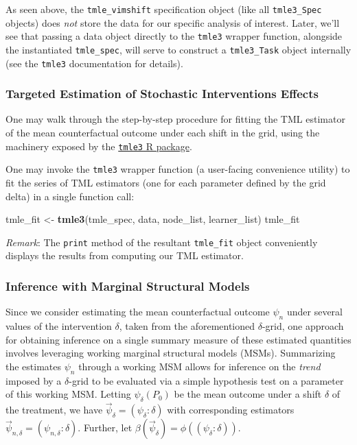 \documentclass[12pt, krantz2,]{krantz}
\newenvironment{Shaded}{\begin{snugshade}}{\end{snugshade}}
\newcommand{\KeywordTok}[1]{\textcolor[rgb]{0.27,0.27,0.27}{\textbf{#1}}}
\newcommand{\NormalTok}[1]{#1}
\newcommand{\StringTok}[1]{\textcolor[rgb]{0.5,0.5,0.5}{#1}}
\theoremstyle{definition}
\theoremstyle{definition}
\theoremstyle{definition}
\newcommand{\1}{\mathbbm{1}}
\begin{document}
As seen above, the \texttt{tmle\_vimshift} specification object (like all \texttt{tmle3\_Spec}
objects) does \emph{not} store the data for our specific analysis of interest. Later,
we'll see that passing a data object directly to the \texttt{tmle3} wrapper function,
alongside the instantiated \texttt{tmle\_spec}, will serve to construct a \texttt{tmle3\_Task}
object internally (see the \texttt{tmle3} documentation for details).

\hypertarget{targeted-estimation-of-stochastic-interventions-effects-1}{%
\subsubsection{Targeted Estimation of Stochastic Interventions Effects}\label{targeted-estimation-of-stochastic-interventions-effects-1}}

One may walk through the step-by-step procedure for fitting the TML estimator
of the mean counterfactual outcome under each shift in the grid, using the
machinery exposed by the \href{https://tmle3.tlverse.org/}{\texttt{tmle3} R package}.

One may invoke the \texttt{tmle3} wrapper function (a user-facing convenience utility)
to fit the series of TML estimators (one for each parameter defined by the grid
delta) in a single function call:

\begin{Shaded}
\begin{Highlighting}[]
\NormalTok{tmle_fit <-}\StringTok{ }\KeywordTok{tmle3}\NormalTok{(tmle_spec, data, node_list, learner_list)}
\NormalTok{tmle_fit}
\end{Highlighting}
\end{Shaded}

\emph{Remark}: The \texttt{print} method of the resultant \texttt{tmle\_fit} object conveniently
displays the results from computing our TML estimator.

\hypertarget{inference-with-marginal-structural-models}{%
\subsubsection{Inference with Marginal Structural Models}\label{inference-with-marginal-structural-models}}

Since we consider estimating the mean counterfactual outcome \(\psi_n\) under
several values of the intervention \(\delta\), taken from the aforementioned
\(\delta\)-grid, one approach for obtaining inference on a single summary measure
of these estimated quantities involves leveraging working marginal structural
models (MSMs). Summarizing the estimates \(\psi_n\) through a working MSM allows
for inference on the \emph{trend} imposed by a \(\delta\)-grid to be evaluated via a
simple hypothesis test on a parameter of this working MSM. Letting
\(\psi_{\delta}(P_0)\) be the mean outcome under a shift \(\delta\) of the
treatment, we have \(\vec{\psi}_{\delta} = (\psi_{\delta}: \delta)\) with
corresponding estimators \(\vec{\psi}_{n, \delta} = (\psi_{n, \delta}: \delta)\).
Further, let \(\beta(\vec{\psi}_{\delta}) = \phi((\psi_{\delta}: \delta))\).
\end{document}
